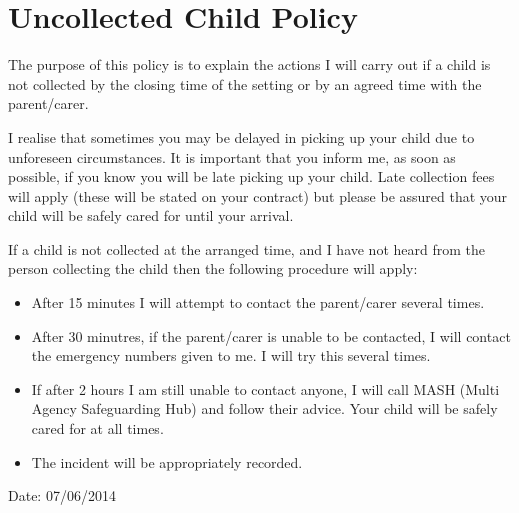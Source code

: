 \documentclass[10pt]{article}
\begin{document}
\section{Uncollected Child Policy}

The purpose of this policy is to explain the actions I will carry out if
a child is not collected by the closing time of the setting or by an
agreed time with the parent/carer.

I realise that sometimes you may be delayed in picking up your child due
to unforeseen circumstances. It is important that you inform me, as soon
as possible, if you know you will be late picking up your child. Late
collection fees will apply (these will be stated on your contract) but
please be assured that your child will be safely cared for until your
arrival.

If a child is not collected at the arranged time, and I have not heard
from the person collecting the child then the following procedure will
apply:

\begin{itemize}
\item
  After 15 minutes I will attempt to contact the parent/carer several
  times.~
\item
  After 30 minutres, if the parent/carer is unable to be contacted, I
  will contact the emergency numbers given to me. I will try this
  several times.~
\item
  If after 2 hours I am still unable to contact anyone, I will call
  MASH (Multi Agency Safeguarding Hub) and follow their advice. Your
  child will be safely cared for at all times. ~
\item
  The incident will be appropriately recorded.~
\end{itemize}

Date: 07/06/2014

~
\end{document}
